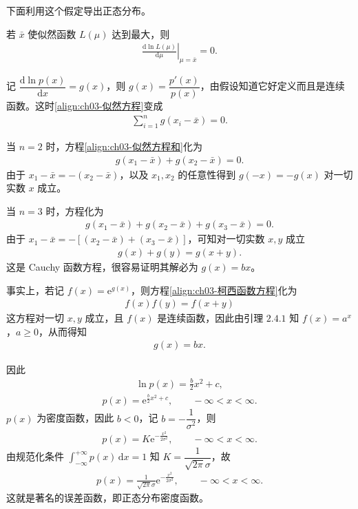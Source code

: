 \documentclass[../../main.tex]{subfiles}
\begin{document}
下面利用这个假定导出正态分布。

若 $\bar{x}$ 使似然函数 $L(\mu)$ 达到最大，则
\begin{align}
\left.\frac{\mathrm{d}\ln L(\mu)}{\mathrm{d}\mu}\right|_{\mu=\bar{x}}=0.\label{align:ch03-似然方程}
\end{align}

记 $\dfrac{\mathrm{d}\ln p(x)}{\mathrm{d}x}=g(x)$，则 $g(x)=\dfrac{p'(x)}{p(x)}$，由假设知道它好定义而且是连续函数。这时\eqref{align:ch03-似然方程}变成
\begin{align}
\sum_{i=1}^{n}g(x_i-\bar{x})=0.\label{align:ch03-似然方程和}
\end{align}

当 $n=2$ 时，方程\eqref{align:ch03-似然方程和}化为
\begin{align*}g(x_1-\bar{x})+g(x_2-\bar{x})=0.\end{align*}
由于 $x_1-\bar{x}=-(x_2-\bar{x})$，以及 $x_1,x_2$ 的任意性得到 $g(-x)=-g(x)$ 对一切实数 $x$ 成立。

当 $n=3$ 时，方程化为
\begin{align*}g(x_1-\bar{x})+g(x_2-\bar{x})+g(x_3-\bar{x})=0.\end{align*}
由于 $x_1-\bar{x}=-[(x_2-\bar{x})+(x_3-\bar{x})]$，可知对一切实数 $x,y$ 成立
\begin{align}
g(x)+g(y)=g(x+y).\label{align:ch03-柯西函数方程}
\end{align}
这是 Cauchy 函数方程，很容易证明其解必为 $g(x)=bx$。

事实上，若记 $f(x)=\mathrm{e}^{g(x)}$，则方程\eqref{align:ch03-柯西函数方程}化为
\begin{align}
f(x)f(y)=f(x+y)\label{align:ch03-指数函数方程}
\end{align}
这方程对一切 $x,y$ 成立，且 $f(x)$ 是连续函数，因此由引理 $2.4.1$ 知 $f(x)=a^{x}$，$a\geqslant 0$，从而得知
\begin{align*}g(x)=bx.\end{align*}

因此
\begin{align*}\ln p(x)=\frac{b}{2}x^{2}+c,\end{align*}
\begin{align*}p(x)=\mathrm{e}^{\frac{b}{2}x^{2}+c},\qquad -\infty<x<\infty.\end{align*}
$p(x)$ 为密度函数，因此 $b<0$，记 $b=-\dfrac{1}{\sigma^{2}}$，则
\begin{align*}p(x)=K\mathrm{e}^{-\frac{x^{2}}{2\sigma^{2}}},\qquad -\infty<x<\infty.\end{align*}
由规范化条件 $\displaystyle\int_{-\infty}^{+\infty}p(x)\,\mathrm{d}x=1$ 知 $K=\dfrac{1}{\sqrt{2\pi}\sigma}$，故
\begin{align*}p(x)=\frac{1}{\sqrt{2\pi}\sigma}\mathrm{e}^{-\frac{x^{2}}{2\sigma^{2}}},\qquad -\infty<x<\infty.\end{align*}
这就是著名的误差函数，即正态分布密度函数。
\end{document}
